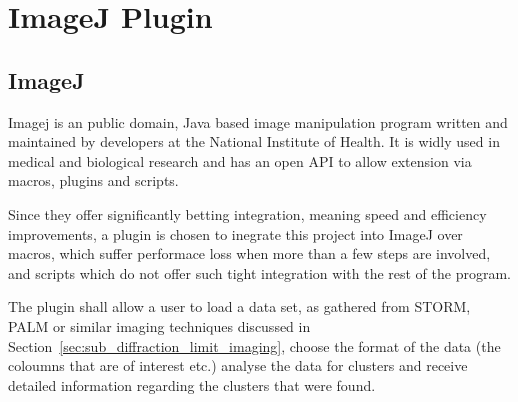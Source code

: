 
\section{ImageJ Plugin}
\label{sec:imagej_plugin}

\subsection{ImageJ}
\label{sub:imagej}

Imagej is an public domain, Java based image manipulation program written and
maintained by developers at the National Institute of Health. It is widly used
in medical and biological research and has an open API to allow extension via
macros, plugins and scripts.

Since they offer significantly betting integration, meaning speed and
efficiency improvements, a plugin is chosen to inegrate this project into
ImageJ over macros, which suffer performace loss when more than a few steps are
involved, and scripts which do not offer such tight integration with the rest
of the program.

The plugin shall allow a user to load a data set, as gathered from STORM, PALM
or similar imaging techniques discussed in
Section~\ref{sec:sub_diffraction_limit_imaging}, choose the format of the data
(the coloumns that are of interest etc.) analyse the data for clusters and
receive detailed information regarding the clusters that were found.
